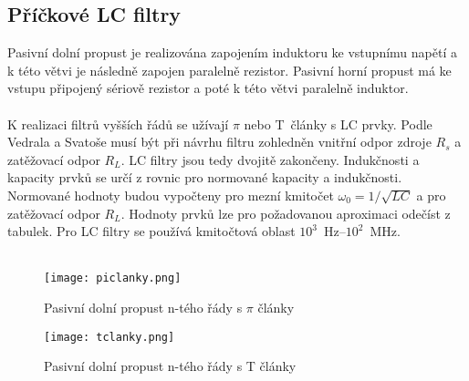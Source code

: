 \subsection{Příčkové LC filtry}\label{s:LC}
Pasivní dolní propust je realizována zapojením induktoru ke vstupnímu napětí a k této větvi je následně zapojen paralelně rezistor. Pasivní horní propust má ke vstupu připojený sériově rezistor a poté k této větvi paralelně induktor. \\
\\
K realizaci filtrů vyšších řádů se užívají $\pi$ nebo T~články s LC prvky. Podle Vedrala a Svatoše \cite{8} musí být při návrhu filtru zohledněn vnitřní odpor zdroje $R_s$ a zatěžovací odpor $R_L$. LC filtry jsou tedy dvojitě zakončeny. Indukčnosti a kapacity prvků se určí z rovnic pro normované kapacity a indukčnosti. Normované hodnoty budou vypočteny pro mezní kmitočet $\omega _0 = 1/\sqrt{LC}$ a pro zatěžovací odpor $R_L$. Hodnoty prvků lze pro požadovanou aproximaci odečíst z tabulek. Pro LC filtry se používá kmitočtová oblast $10^{3}$~Hz--$10^{2}$~MHz.\\
\\
\begin{figure}[h]
\centering
\texttt{[image: piclanky.png]}
\caption[Pasivní dolní propust n-tého řády s $\pi$ články]{Pasivní dolní propust n-tého řády s $\pi$ články \cite{8}}
\end{figure}
\begin{figure}[h]
\centering
\texttt{[image: tclanky.png]}
\caption[Pasivní dolní propust n-tého řády s T články]{Pasivní dolní propust n-tého řády s T články \cite{8}}
\end{figure}
